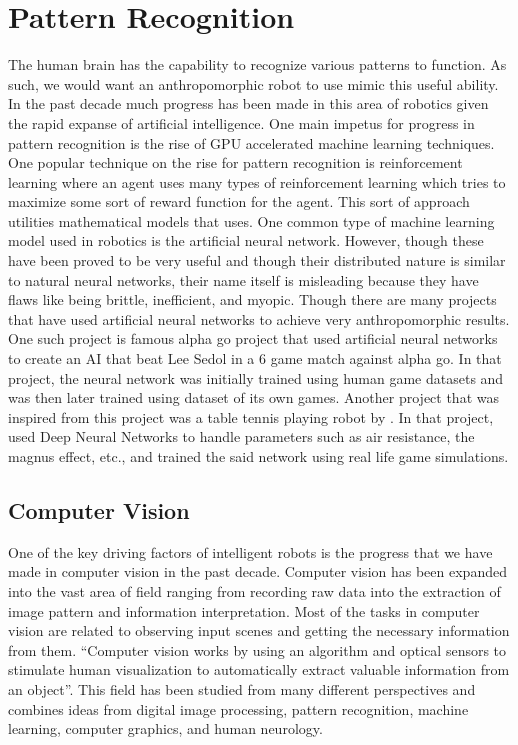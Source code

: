 \documentclass[conference]{IEEEtran}
\begin{document}
\section{Pattern Recognition}
The human brain has the capability to recognize various patterns to function. As such, we would want an anthropomorphic robot to use mimic this useful ability. In the past decade much progress has been made in this area of robotics given the rapid expanse of artificial intelligence. One main impetus for progress in pattern recognition is the rise of GPU accelerated machine learning techniques. One popular technique on the rise for pattern recognition is reinforcement learning where an agent uses many types of reinforcement learning which tries to maximize some sort of reward function for the agent. This sort of approach utilities mathematical models that uses. One common type of machine learning model used in robotics is the artificial neural network. However, though these have been proved to be very useful and though their distributed nature is similar to natural neural networks, their name itself is misleading because they have flaws like being brittle, inefficient, and myopic\autocite{Watson2019}. Though there are many projects that have used artificial neural networks to achieve very anthropomorphic results. One such project is famous alpha go project that used artificial neural networks to create an AI that beat Lee Sedol in a 6 game match against alpha go\autocite{silver2017mastering}. In that project, the neural network was initially trained using human game datasets and was then later trained using dataset of its own games\autocite{silver2017mastering}. Another project that was inspired from this project was a table tennis playing robot by \textcite{lin2020}. In that project, \textcite{lin2020} used Deep Neural Networks to handle parameters such as air resistance, the magnus effect, etc., and trained the said network using real life game simulations.

\subsection{Computer Vision}
One of the key driving factors of intelligent robots is the progress that we have made in computer vision in the past decade. Computer vision has been expanded into the vast area of field ranging from recording raw data into the extraction of image pattern and information interpretation\autocite{patel2012machine}. Most of the tasks in computer vision are related to observing input scenes and getting the necessary information from them. ``Computer vision works by using an algorithm and optical sensors to stimulate human visualization to automatically extract valuable information from an object''\autocite{wiley2018computer}. This field has been studied from many different perspectives and combines ideas from digital image processing, pattern recognition, machine learning, computer graphics, and human neurology. 
\end{document}
